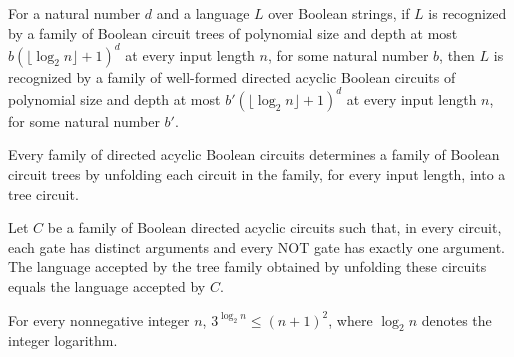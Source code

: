 \begin{theorem}
\label{Language.InTreeAC.inAC}
\leanok
{}
For a natural number $d$ and a language $L$ over Boolean strings, if $L$ is recognized
by a family of Boolean circuit trees of polynomial size and depth at most
$b(\lfloor\log_2 n\rfloor+1)^d$ at every input length $n$, for some natural number $b$,
then $L$ is recognized by a family of well-formed directed acyclic Boolean circuits of
polynomial size and depth at most $b'(\lfloor\log_2 n\rfloor+1)^d$ at every input length
$n$, for some natural number $b'$.
\end{theorem}

\begin{definition}
\label{BoolCircuit.DAGCircuitFamily.toTree}
\leanok
{}
Every family of directed acyclic Boolean circuits determines a family of Boolean circuit
trees by unfolding each circuit in the family, for every input length, into a tree
circuit.
\end{definition}

\begin{theorem}
\label{BoolCircuit.DAGCircuitFamily.language_toTree}
\leanok
{}
Let $C$ be a family of Boolean directed acyclic circuits such that, in every circuit,
each gate has distinct arguments and every NOT gate has exactly one argument. The
language accepted by the tree family obtained by unfolding these circuits equals the
language accepted by $C$.
\end{theorem}

\begin{theorem}
\label{BoolCircuit.three_pow_log_le}
\leanok
{}
For every nonnegative integer $n$, $3^{\log_2 n} \le (n+1)^2$, where $\log_2 n$ denotes
the integer logarithm.
\end{theorem}

